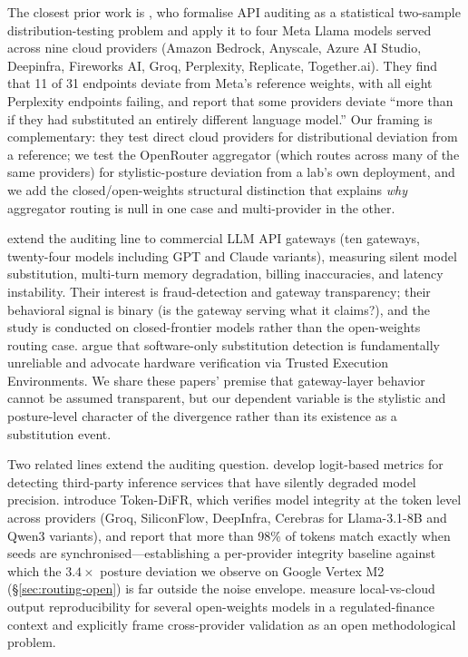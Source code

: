 \documentclass[11pt,a4paper]{article}
\begin{document}
The closest prior work is \citet{gao2025modelequality}, who formalise API auditing as a statistical two-sample distribution-testing problem and apply it to four Meta Llama models served across nine cloud providers (Amazon Bedrock, Anyscale, Azure AI Studio, Deepinfra, Fireworks AI, Groq, Perplexity, Replicate, Together.ai). They find that 11 of 31 endpoints deviate from Meta's reference weights, with all eight Perplexity endpoints failing, and report that some providers deviate ``more than if they had substituted an entirely different language model.'' Our framing is complementary: they test direct cloud providers for distributional deviation from a reference; we test the OpenRouter aggregator (which routes across many of the same providers) for stylistic-posture deviation from a lab's own deployment, and we add the closed/open-weights structural distinction that explains \emph{why} aggregator routing is null in one case and multi-provider in the other.

\citet{lin2026gatescope} extend the auditing line to commercial LLM API gateways (ten gateways, twenty-four models including GPT and Claude variants), measuring silent model substitution, multi-turn memory degradation, billing inaccuracies, and latency instability. Their interest is fraud-detection and gateway transparency; their behavioral signal is binary (is the gateway serving what it claims?), and the study is conducted on closed-frontier models rather than the open-weights routing case. \citet{cai2025substitution} argue that software-only substitution detection is fundamentally unreliable and advocate hardware verification via Trusted Execution Environments. We share these papers' premise that gateway-layer behavior cannot be assumed transparent, but our dependent variable is the stylistic and posture-level character of the divergence rather than its existence as a substitution event.

Two related lines extend the auditing question. \citet{miao2025consistency} develop logit-based metrics for detecting third-party inference services that have silently degraded model precision. \citet{karvonen2025difr} introduce Token-DiFR, which verifies model integrity at the token level across providers (Groq, SiliconFlow, DeepInfra, Cerebras for Llama-3.1-8B and Qwen3 variants), and report that more than 98\% of tokens match exactly when seeds are synchronised---establishing a per-provider integrity baseline against which the $3.4\times$ posture deviation we observe on Google Vertex M2 (\S\ref{sec:routing-open}) is far outside the noise envelope. \citet{khatchadourian2025outputdrift} measure local-vs-cloud output reproducibility for several open-weights models in a regulated-finance context and explicitly frame cross-provider validation as an open methodological problem.
\end{document}
